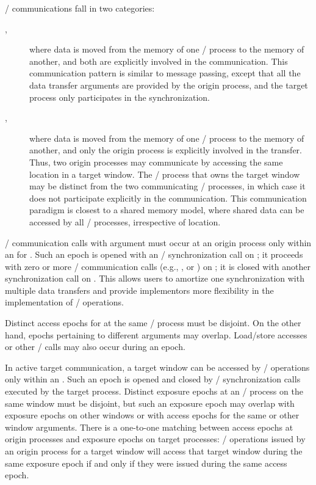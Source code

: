 \RMA/ communications fall in two categories:
\begin{description}
\item[,] where data is moved from the memory of one
\mpi/ process to the memory of another, and both are explicitly involved in the
communication.  This communication pattern is similar to message
passing, except that all the data transfer arguments are provided by
the origin process, and the target process only participates in the synchronization.
\item[,] where data is moved from the memory of one
\mpi/ process to the memory of another, and only the origin process is
explicitly involved
in
the transfer.  Thus, two origin processes may communicate by accessing
the same location in a target window.  The \mpi/ process that owns the
target window may be distinct from the two communicating \mpi/ processes, 
in which case it does not participate explicitly in the communication.
This communication
paradigm is closest to a shared memory model, where shared data can be
accessed by all \mpi/ processes, irrespective 
of location.
\end{description}

\RMA/ communication calls with argument  must occur at an origin process
only within an  for .  Such an epoch
is opened with an \RMA/ synchronization
call on ; it proceeds with zero or more \RMA/
communication calls (e.g., ,  or
) on ; it is closed with another
synchronization call on 
. This allows users to amortize one synchronization with multiple data
transfers and provide implementors
more flexibility in the implementation of \RMA/ operations.

Distinct access epochs for  at the same \mpi/ process must be disjoint.
On the other hand, epochs pertaining to different  arguments
may
overlap.  Load/store accesses or other \MPI/ calls may also occur during
an epoch.

In active target communication, a target window can be accessed by \RMA/
operations only within an . Such an epoch is
opened and closed by \RMA/ synchronization calls executed by the
target process.  Distinct exposure epochs at an \mpi/ process
on the same window must be disjoint, but such an exposure epoch
may overlap with exposure epochs on other windows or
with access epochs for the same or other window arguments.
There is a one-to-one matching between access epochs at origin
processes and exposure epochs on target processes:
\RMA/ operations issued by an origin process for a target window will
access that
target window during the same exposure epoch if and only if they were
issued during the same access 
epoch.

